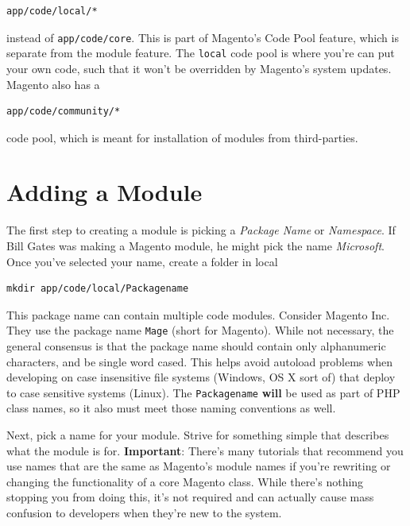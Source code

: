 \documentclass[oneside]{book}
\begin{document}
\begin{lstlisting}
app/code/local/*

\end{lstlisting}


instead of \footnotesize\texttt{app/code/core}\normalsize. This is part of Magento's Code Pool feature, which is separate from the module feature.  The \footnotesize\texttt{local} \normalsize  code pool is where you're can put your own code, such that it won't be overridden by Magento's system updates.  Magento also has a

\begin{lstlisting}
app/code/community/*

\end{lstlisting}


code pool, which is meant for installation of modules from third-parties.

\section{Adding a Module}

The first step to creating a module is picking a \emph{Package Name} or \emph{Namespace}.  If Bill Gates was making a Magento module, he might pick the name \emph{Microsoft}.  Once you've selected your name, create a folder in local

\begin{lstlisting}
mkdir app/code/local/Packagename

\end{lstlisting}


This package name can contain multiple code modules.  Consider Magento Inc.  They use the package name \footnotesize\texttt{Mage} \normalsize  (short for Magento).  While not necessary, the general consensus is that the package name should contain only alphanumeric characters, and be single word cased.  This helps avoid autoload problems when developing on case insensitive file systems (Windows, OS X sort of) that deploy to case sensitive systems (Linux). The \footnotesize\texttt{Packagename} \normalsize  \textbf{will} be used as part of PHP class names, so it also must meet those naming conventions as well.

Next, pick a name for your module. Strive for something simple that describes what the module is for.  \textbf{Important}: There's many tutorials that recommend you use names that are the same as Magento's module names if you're rewriting or changing the functionality of a core Magento class.  While there's nothing stopping you from doing this, it's not required and can actually cause mass confusion to developers when they're new to the system.
\end{document}

